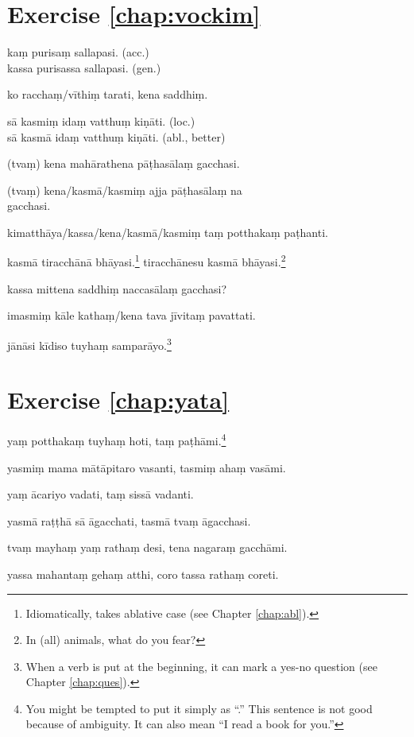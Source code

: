 \section*{Exercise \ref{chap:vockim}}
\begin{answerkey}
\item ka\d m purisa\d m sallapasi. (acc.)\\kassa purisassa sallapasi. (gen.)
\item ko raccha\d m/v\=ithi\d m tarati, kena saddhi\d m.
\item s\=a kasmi\d m ida\d m vatthu\d m ki\d n\=ati. (loc.)\\s\=a kasm\=a ida\d m vatthu\d m ki\d n\=ati. (abl., better)
\item (tva\d m) kena mah\=arathena p\=a\d thas\=ala\d m gacchasi.
\item (tva\d m) kena/kasm\=a/kasmi\d m ajja p\=a\d thas\=ala\d m na \\gacchasi.
\item kimatth\=aya/kassa/kena/kasm\=a/kasmi\d m ta\d m potthaka\d m pa\d thanti.
\item kasm\=a tiracch\=an\=a bh\=ayasi.\footnote{Idiomatically,  takes ablative case (see Chapter \ref{chap:abl}).} tiracch\=anesu kasm\=a bh\=ayasi.\footnote{In (all) animals, what do you fear?}
\item kassa mittena saddhi\d m naccas\=ala\d m gacchasi?
\item imasmi\d m k\=ale katha\d m/kena tava j\=ivita\d m pavattati.
\item j\=an\=asi k\=idiso tuyha\d m sampar\=ayo.\footnote{When a verb is put at the beginning, it can mark a yes-no question (see Chapter \ref{chap:ques}).}
\end{answerkey}

\section*{Exercise \ref{chap:yata}}
\begin{answerkey}
\item ya\d m potthaka\d m tuyha\d m hoti, ta\d m pa\d th\=ami.\footnote{You might be tempted to put it simply as ``.'' This sentence is not good because of ambiguity. It can also mean ``I read a book for you.''}
\item yasmi\d m mama m\=at\=apitaro vasanti, tasmi\d m aha\d m vas\=ami.
\item ya\d m \=acariyo vadati, ta\d m siss\=a vadanti.
\item yasm\=a ra\d t\d th\=a s\=a \=agacchati, tasm\=a tva\d m \=agacchasi.
\item tva\d m mayha\d m ya\d m ratha\d m desi, tena nagara\d m gacch\=ami.
\item yassa mahanta\d m geha\d m atthi, coro tassa ratha\d m coreti.
\end{answerkey}

